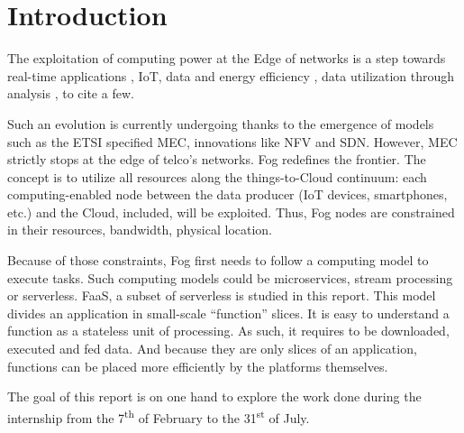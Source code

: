 \newcommand{\varthreestars}{\begin{center}\begin{tabular}{c}$\ast$\\[-2ex] $\ast\enspace \ast $\end{tabular}\end{center}}

\section{Introduction}
The exploitation of computing power at the Edge of networks is a step towards real-time applications \cite{rausch_towards_2021,lin_cloudfog_2017}, \gls{IoT}, data and energy efficiency \cite{ieee_standards_association_ieee_2018}, data utilization through analysis \cite{openfog_consortium_real-time_2018}, to cite a few.

Such an evolution is currently undergoing thanks to the emergence of models such as the \gls{ETSI} specified \gls{MEC}, innovations like \gls{NFV} and \gls{SDN}. However, \gls{MEC} strictly stops at the edge of telco’s networks. Fog redefines the frontier. The concept is to utilize all resources along the things-to-Cloud continuum: each computing-enabled node between the data producer (\gls{IoT} devices, smartphones, etc.) and the Cloud, included, will be exploited. Thus, Fog nodes are constrained in their resources, bandwidth, physical location.

Because of those constraints, Fog first needs to follow a computing model to execute tasks. Such computing models could be microservices, stream processing or serverless. \gls{FaaS}, a subset of serverless is studied in this report. This model divides an application in small-scale “function” slices. It is easy to understand a function as a stateless unit of processing. As such, it requires to be downloaded, executed and fed data. And because they are only slices of an application, functions can be placed more efficiently by the platforms themselves.

The goal of this report is on one hand to explore the work done during the internship from the 7\textsuperscript{th} of February to the 31\textsuperscript{st} of July.


